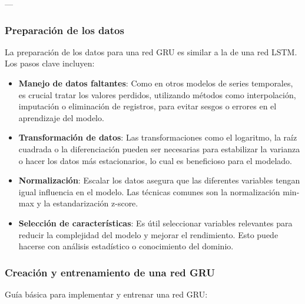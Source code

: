 \documentclass[11pt]{article}
\begin{document}
---

\subsubsection{Preparación de los datos}
\label{sec:orgb6eb8d6}
La preparación de los datos para una red GRU es similar a la de una red LSTM. Los pasos clave incluyen:

\begin{itemize}
\item \textbf{\textbf{Manejo de datos faltantes}}: Como en otros modelos de series temporales, es crucial tratar los valores perdidos, utilizando métodos como interpolación, imputación o eliminación de registros, para evitar sesgos o errores en el aprendizaje del modelo.

\item \textbf{\textbf{Transformación de datos}}: Las transformaciones como el logaritmo, la raíz cuadrada o la diferenciación pueden ser necesarias para estabilizar la varianza o hacer los datos más estacionarios, lo cual es beneficioso para el modelado.

\item \textbf{\textbf{Normalización}}: Escalar los datos asegura que las diferentes variables tengan igual influencia en el modelo. Las técnicas comunes son la normalización min-max y la estandarización z-score.

\item \textbf{\textbf{Selección de características}}: Es útil seleccionar variables relevantes para reducir la complejidad del modelo y mejorar el rendimiento. Esto puede hacerse con análisis estadístico o conocimiento del dominio.
\end{itemize}

\subsubsection{Creación y entrenamiento de una red GRU}
\label{sec:org60d95f0}
Guía básica para implementar y entrenar una red GRU:
\end{document}
